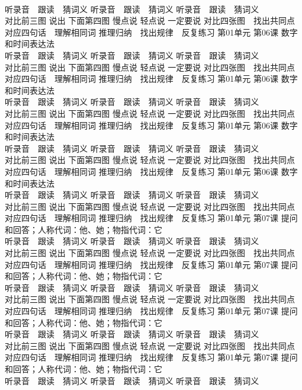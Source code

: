 \documentclass[8pt]{extreport}
\begin{document}
\begin{CJK}{UTF8}{min}
\\	听录音　跟读　猜词义 听录音　跟读　猜词义 听录音　跟读　猜词义 
\\	对比前三图 说出 下面第四图 慢点说 轻点说 一定要说	对比四张图　找出共同点 对应四句话　理解相同词 推理归纳　找出规律　反复练习 第01单元 第06课 数字和时间表达法
\\	听录音　跟读　猜词义 听录音　跟读　猜词义 听录音　跟读　猜词义 
\\	对比前三图 说出 下面第四图 慢点说 轻点说 一定要说	对比四张图　找出共同点 对应四句话　理解相同词 推理归纳　找出规律　反复练习 第01单元 第06课 数字和时间表达法
\\	听录音　跟读　猜词义 听录音　跟读　猜词义 听录音　跟读　猜词义 
\\	对比前三图 说出 下面第四图 慢点说 轻点说 一定要说	对比四张图　找出共同点 对应四句话　理解相同词 推理归纳　找出规律　反复练习 第01单元 第06课 数字和时间表达法
\\	听录音　跟读　猜词义 听录音　跟读　猜词义 听录音　跟读　猜词义 
\\	对比前三图 说出 下面第四图 慢点说 轻点说 一定要说	对比四张图　找出共同点 对应四句话　理解相同词 推理归纳　找出规律　反复练习 第01单元 第06课 数字和时间表达法
\\	听录音　跟读　猜词义 听录音　跟读　猜词义 听录音　跟读　猜词义 
\\	对比前三图 说出 下面第四图 慢点说 轻点说 一定要说	对比四张图　找出共同点 对应四句话　理解相同词 推理归纳　找出规律　反复练习 第01单元 第07课 提问和回答；人称代词：他、她；物指代词：它
\\	听录音　跟读　猜词义 听录音　跟读　猜词义 听录音　跟读　猜词义 
\\	对比前三图 说出 下面第四图 慢点说 轻点说 一定要说	对比四张图　找出共同点 对应四句话　理解相同词 推理归纳　找出规律　反复练习 第01单元 第07课 提问和回答；人称代词：他、她；物指代词：它
\\	听录音　跟读　猜词义 听录音　跟读　猜词义 听录音　跟读　猜词义 
\\	对比前三图 说出 下面第四图 慢点说 轻点说 一定要说	对比四张图　找出共同点 对应四句话　理解相同词 推理归纳　找出规律　反复练习 第01单元 第07课 提问和回答；人称代词：他、她；物指代词：它
\\	听录音　跟读　猜词义 听录音　跟读　猜词义 听录音　跟读　猜词义 
\\	对比前三图 说出 下面第四图 慢点说 轻点说 一定要说	对比四张图　找出共同点 对应四句话　理解相同词 推理归纳　找出规律　反复练习 第01单元 第07课 提问和回答；人称代词：他、她；物指代词：它
\\	听录音　跟读　猜词义 听录音　跟读　猜词义 听录音　跟读　猜词义 

\end{CJK}
\end{document}
